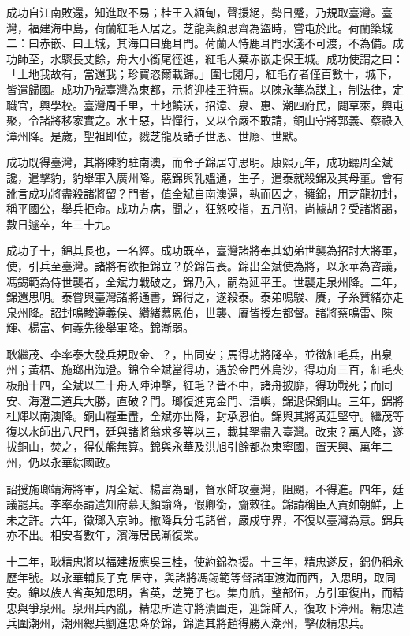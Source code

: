 \begin{pinyinscope}
成功自江南敗還，知進取不易；桂王入緬甸，聲援絕，勢日蹙，乃規取臺灣。臺灣，福建海中島，荷蘭紅毛人居之。芝龍與顏思齊為盜時，嘗屯於此。荷蘭築城二：曰赤嵌、曰王城，其海口曰鹿耳門。荷蘭人恃鹿耳門水淺不可渡，不為備。成功師至，水驟長丈餘，舟大小銜尾徑進，紅毛人棄赤嵌走保王城。成功使謂之曰：「土地我故有，當還我；珍寶恣爾載歸。」圍七閱月，紅毛存者僅百數十，城下，皆遣歸國。成功乃號臺灣為東都，示將迎桂王狩焉。以陳永華為謀主，制法律，定職官，興學校。臺灣周千里，土地饒沃，招漳、泉、惠、潮四府民，闢草萊，興屯聚，令諸將移家實之。水土惡，皆憚行，又以令嚴不敢請，銅山守將郭義、蔡祿入漳州降。是歲，聖祖即位，戮芝龍及諸子世恩、世廕、世默。

成功既得臺灣，其將陳豹駐南澳，而令子錦居守思明。康熙元年，成功聽周全斌讒，遣擊豹，豹舉軍入廣州降。惡錦與乳媼通，生子，遣泰就殺錦及其母董。會有訛言成功將盡殺諸將留？門者，值全斌自南澳還，執而囚之，擁錦，用芝龍初封，稱平國公，舉兵拒命。成功方病，聞之，狂怒咬指，五月朔，尚據胡？受諸將謁，數日遽卒，年三十九。

成功子十，錦其長也，一名經。成功既卒，臺灣諸將奉其幼弟世襲為招討大將軍，使，引兵至臺灣。諸將有欲拒錦立？於錦告喪。錦出全斌使為將，以永華為咨議，馮錫範為侍世襲者，全斌力戰破之，錦乃入，嗣為延平王。世襲走泉州降。二年，錦還思明。泰嘗與臺灣諸將通書，錦得之，遂殺泰。泰弟鳴駿、賡，子糸贊緒亦走泉州降。詔封鳴駿遵義侯、纘緒慕恩伯，世襲、賡皆授左都督。諸將蔡鳴雷、陳輝、楊富、何義先後舉軍降。錦漸弱。

耿繼茂、李率泰大發兵規取金、？，出同安；馬得功將降卒，並徵紅毛兵，出泉州；黃梧、施瑯出海澄。錦令全斌當得功，遇於金門外烏沙，得功舟三百，紅毛夾板船十四，全斌以二十舟入陣沖擊，紅毛？皆不中，諸舟披靡，得功戰死；而同安、海澄二道兵大勝，直破？門。瑯復進克金門、浯嶼，錦退保銅山。三年，錦將杜輝以南澳降。銅山糧垂盡，全斌亦出降，封承恩伯。錦與其將黃廷堅守。繼茂等復以水師出八尺門，廷與諸將翁求多等以三，載其孥盡入臺灣。改東？萬人降，遂拔銅山，焚之，得仗艦無算。錦與永華及洪旭引餘都為東寧國，置天興、萬年二州，仍以永華綜國政。

詔授施瑯靖海將軍，周全斌、楊富為副，督水師攻臺灣，阻颶，不得進。四年，廷議罷兵。李率泰請遣知府慕天顏諭降，假卿銜，齎敕往。錦請稱臣入貢如朝鮮，上未之許。六年，徵瑯入京師。撤降兵分屯諸省，嚴戍守界，不復以臺灣為意。錦兵亦不出。相安者數年，濱海居民漸復業。

十二年，耿精忠將以福建叛應吳三桂，使約錦為援。十三年，精忠遂反，錦仍稱永歷年號。以永華輔長子克居守，與諸將馮錫範等督諸軍渡海而西，入思明，取同安。錦以族人省英知思明，省英，芝筦子也。集舟航，整部伍，方引軍復出，而精忠與爭泉州。泉州兵內亂，精忠所遣守將潰圍走，迎錦師入，復攻下漳州。精忠遣兵圍潮州，潮州總兵劉進忠降於錦，錦遣其將趙得勝入潮州，擊破精忠兵。


\end{pinyinscope}
